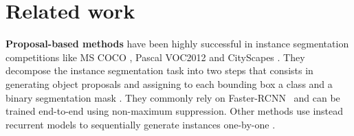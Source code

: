 
\section{Related work} \label{sec:related_work}
\textbf{Proposal-based methods} have been highly successful in instance segmentation competitions like MS COCO \cite{lin2014microsoft}, Pascal VOC2012 \cite{everingham2010pascal} and CityScapes \cite{cordts2016cityscapes}. They decompose the instance segmentation task into two steps that consists in generating object proposals and assigning to each bounding box a class and a binary segmentation mask \cite{he2017mask,yang2012layered,li2017fully,ladicky2010and,hariharan2014simultaneous,chen2015multi,dai2016instance,liang2016reversible}. 
They commonly rely on {Faster-RCNN}~\cite{ren2015faster} and can be trained end-to-end using non-maximum suppression. Other methods use instead recurrent models to sequentially generate instances one-by-one \cite{romera2016recurrent,ren2017end}.

